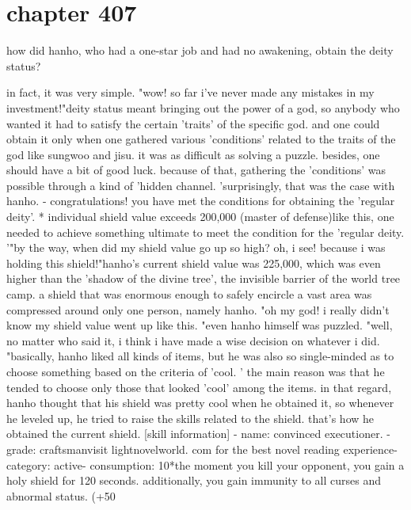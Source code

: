 \section{chapter 407}

how did hanho, who had a one-star job and had no awakening, obtain the deity status?




in fact, it was very simple.
"wow! so far i've never made any mistakes in my investment!"deity status meant bringing out the power of a god, so anybody who wanted it had to satisfy the certain 'traits' of the specific god.
and one could obtain it only when one gathered various 'conditions' related to the traits of the god like sungwoo and jisu.
 it was as difficult as solving a puzzle.
 besides, one should have a bit of good luck.
 because of that, gathering the 'conditions' was possible through a kind of 'hidden channel.
'surprisingly, that was the case with hanho.
- congratulations! you have met the conditions for obtaining the 'regular deity'.
* individual shield value exceeds 200,000 (master of defense)like this, one needed to achieve something ultimate to meet the condition for the 'regular deity.
'"by the way, when did my shield value go up so high? oh, i see! because i was holding this shield!"hanho's current shield value was 225,000, which was even higher than the 'shadow of the divine tree', the invisible barrier of the world tree camp.
a shield that was enormous enough to safely encircle a vast area was compressed around only one person, namely hanho.
 "oh my god! i really didn't know my shield value went up like this.
"even hanho himself was puzzled.
"well, no matter who said it, i think i have made a wise decision on whatever i did.
"basically, hanho liked all kinds of items, but he was also so single-minded as to choose something based on the criteria of 'cool.
' the main reason was that he tended to choose only those that looked 'cool' among the items.
 in that regard, hanho thought that his shield was pretty cool when he obtained it, so whenever he leveled up, he tried to raise the skills related to the shield.
that's how he obtained the current shield.
 [skill information]
- name: convinced executioner.
- grade: craftsmanvisit lightnovelworld.
c‌om for the best novel reading experience- category: active- consumption: 10*the moment you kill your opponent, you gain a holy shield for 120 seconds.
 additionally, you gain immunity to all curses and abnormal status.
 (+50%
